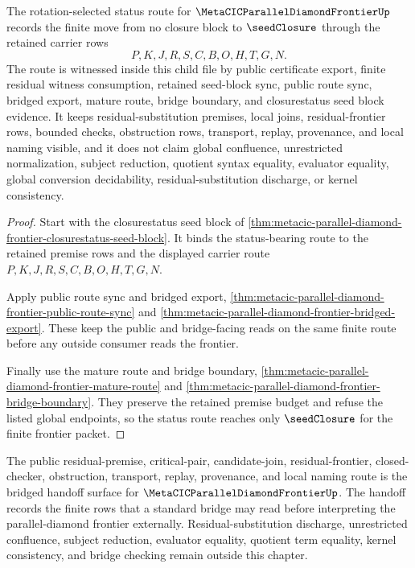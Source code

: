 \begin{theorem}
\label{thm:metacic-parallel-diamond-frontier-closurestatus-status-route}
The rotation-selected status route for $\MetaCICParallelDiamondFrontierUp$ records the finite move from no closure block to $\seedClosure$ through the retained carrier rows
$$
P,K,J,R,S,C,B,O,H,T,G,N.
$$
The route is witnessed inside this child file by public certificate export, finite residual witness consumption, retained seed-block sync, public route sync, bridged export, mature route, bridge boundary, and closurestatus seed block evidence. It keeps residual-substitution premises, local joins, residual-frontier rows, bounded checks, obstruction rows, transport, replay, provenance, and local naming visible, and it does not claim global confluence, unrestricted normalization, subject reduction, quotient syntax equality, evaluator equality, global conversion decidability, residual-substitution discharge, or kernel consistency.
\end{theorem}
\begin{proof}
Start with the closurestatus seed block of \autoref{thm:metacic-parallel-diamond-frontier-closurestatus-seed-block}. It binds the status-bearing route to the retained premise rows and the displayed carrier route $P,K,J,R,S,C,B,O,H,T,G,N$.

Apply public route sync and bridged export, \autoref{thm:metacic-parallel-diamond-frontier-public-route-sync} and \autoref{thm:metacic-parallel-diamond-frontier-bridged-export}. These keep the public and bridge-facing reads on the same finite route before any outside consumer reads the frontier.

Finally use the mature route and bridge boundary, \autoref{thm:metacic-parallel-diamond-frontier-mature-route} and \autoref{thm:metacic-parallel-diamond-frontier-bridge-boundary}. They preserve the retained premise budget and refuse the listed global endpoints, so the status route reaches only $\seedClosure$ for the finite frontier packet.
\end{proof}

\begin{theorem}
\label{thm:metacic-parallel-diamond-bridged-handoff}
The public residual-premise, critical-pair, candidate-join, residual-frontier, closed-checker, obstruction, transport, replay, provenance, and local naming route is the bridged handoff surface for $\MetaCICParallelDiamondFrontierUp$. The handoff records the finite rows that a standard bridge may read before interpreting the parallel-diamond frontier externally. Residual-substitution discharge, unrestricted confluence, subject reduction, evaluator equality, quotient term equality, kernel consistency, and bridge checking remain outside this chapter.
\end{theorem}

